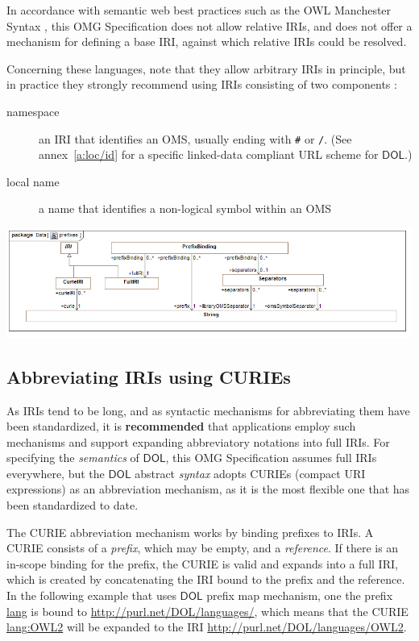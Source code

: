 \documentclass[10pt,fleqn,final]{scrreprt}
\newcommand{\cbs}[0]{\color{red}\xspace} %
\newcommand*{\syntax}[1]{\texttt{#1}}
\newcommand*{\recommended}{\textbf{recommended}\xspace}
\newcommand*{\IS}{OMG Specification\xspace}
\newcommand*{\DOL}{\ensuremath{\mathsf{DOL}}\xspace}
\newcommand{\ssclause}[1]{\subsection{#1}}
\newenvironment{definitions}[0]{\medskip }{}
\begin{document}
\begin{definitions}
In accordance with semantic web best practices such as the OWL Manchester Syntax 
\cite{W3C:NOTE-owl2-manchester-syntax-20091027}, this \IS does not allow relative IRIs, and does 
not offer a mechanism for defining a base IRI, against which relative IRIs could be resolved.

Concerning these languages, note that they allow arbitrary IRIs in principle, but in practice they 
strongly recommend using IRIs consisting of two components \cite{W3C:NOTE-swbp-vocab-pub-20080828}:
\begin{description}
\item[namespace] an IRI that identifies an OMS,
usually ending with \syntax{\#} or \syntax{/}. ({See annex~\ref{a:loc/id} for a specific linked-data compliant URL scheme for \DOL.})
\item[local name] a name that identifies a non-logical symbol within an OMS
\end{description}

\medskip
\includegraphics[width=\textwidth]{mof/Class_Diagram__prefixes.png}



%
\ssclause{Abbreviating IRIs using CURIEs}\label{c:curies}

As IRIs tend to be long, and as syntactic mechanisms for abbreviating them have been standardized, 
it is \recommended that applications employ such mechanisms and support expanding abbreviatory
notations into full IRIs.  For specifying the \emph{semantics} of \DOL, this \IS assumes full IRIs 
everywhere, but the \DOL abstract \emph{syntax} adopts CURIEs (compact URI expressions) as an 
abbreviation mechanism, as it is the most flexible one that has been standardized to date.  

The CURIE abbreviation mechanism works by binding prefixes to IRIs.  A CURIE consists of a 
\emph{prefix}, which may be empty, and a \emph{reference}.  If there is an in-scope binding for the 
prefix, the CURIE is valid and expands into a full IRI, which is created by concatenating the IRI 
bound to the prefix and the reference. \cbs In the following example that uses \DOL prefix map mechanism, one the prefix \url{lang} is bound to \url{http://purl.net/DOL/languages/}, which
means that the CURIE \url{lang:OWL2} will be expanded to the IRI
\url{http://purl.net/DOL/languages/OWL2}.


\end{definitions}
\end{document}
